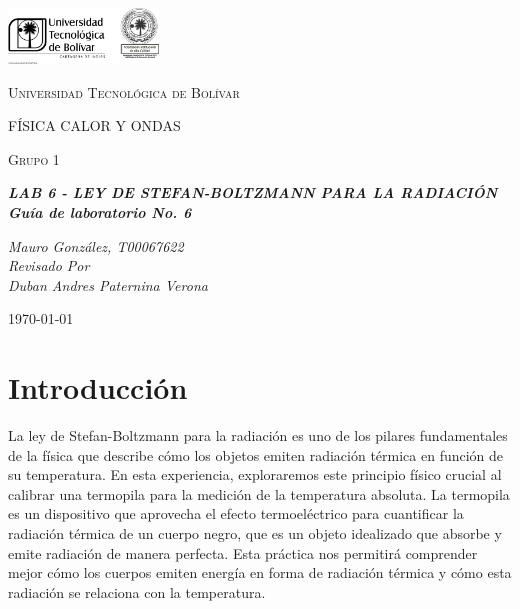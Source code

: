 \documentclass[twocolumn, 12pt]{article}
\begin{document}
\begin{titlepage}
      \centering
      \includegraphics[width=0.3\textwidth]{Images/logo_utb.png}\par\vspace{1cm}
      {\scshape\LARGE Universidad Tecnológica de Bolívar \par}
      \vspace{1cm}

      {\scshape\Large FÍSICA CALOR Y ONDAS \par}
      \vspace{.2cm}

      {\scshape\Large Grupo 1 \par}
      \vspace{2cm}
      \slshape {\Large \bfseries{}LAB 6 - LEY DE STEFAN-BOLTZMANN PARA LA RADIACIÓN\\}
      \slshape {\small \bfseries{} Guía de laboratorio No. 6}
      \vspace{4cm}

      \slshape {\itshape{} Mauro González, T00067622 \\}
      \vfill
      Revisado Por \\
      Duban Andres Paternina Verona\\
      {\large \today\par}
\end{titlepage}

\section{Introducción}

La ley de Stefan-Boltzmann para la radiación es uno de los
pilares fundamentales de la física que describe cómo los
objetos emiten radiación térmica en función de su
temperatura. En esta experiencia, exploraremos este
principio físico crucial al calibrar una termopila para la
medición de la temperatura absoluta. La termopila es un
dispositivo que aprovecha el efecto termoeléctrico para
cuantificar la radiación térmica de un cuerpo negro, que es
un objeto idealizado que absorbe y emite radiación de
manera perfecta. Esta práctica nos permitirá comprender
mejor cómo los cuerpos emiten energía en forma de radiación
térmica y cómo esta radiación se relaciona con la
temperatura.
\end{document}
